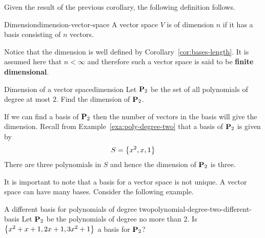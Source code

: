 Given the result of the previous corollary, the following definition follows.

\begin{definition}{Dimension}{dimension-vector-space}
  A vector space $V$ is of dimension $n$ if it has a basis consisting
  of $n$ vectors.
\end{definition}

Notice that the dimension is well defined by
Corollary~\ref{cor:bases-length}. It is assumed here that $n<\infty $
and therefore such a vector space is said to be \textbf{finite
  dimensional}.

\begin{example}{Dimension of a vector space}{dimension}
  Let $\mathbf{P}_2$ be the set of all polynomials of degree at most
  $2$. Find the dimension of $\mathbf{P}_2$.
\end{example}

\begin{solution}
  If we can find a basis of $\mathbf{P}_2$ then the number of vectors in
  the basis will give the dimension. Recall from
  Example~\ref{exa:poly-degree-two} that a basis of $\mathbf{P}_2$ is given
  by
  \begin{equation*}
    S  = \left\{x^2, x, 1 \right\}
  \end{equation*}
  There are three polynomials in $S$ and hence the dimension of
  $\mathbf{P}_2$ is three.
\end{solution}

It is important to note that a basis for a vector space is not
unique. A vector space can have many bases. Consider the following
example.

\begin{example}{A different basis for polynomials of degree two}{polynomial-degree-two-different-basis}
  Let $\mathbf{P}_2$ be the polynomials of degree no more than 2. Is
  $\left\{ x^{2}+x+1,2x+1,3x^{2}+1\right\} $ a basis for $\mathbf{P}_2$?
\end{example}

